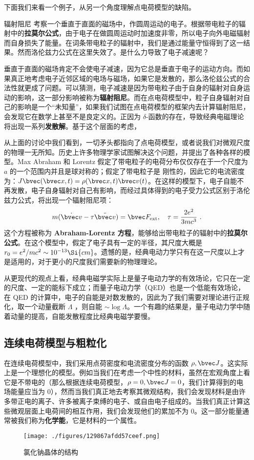 下面我们来看一个例子，从另一个角度理解点电荷模型的缺陷。
\begin{example}{辐射阻尼}
考察一个垂直于直面的磁场中，作圆周运动的电子。根据带电粒子的辐射中的\textbf{拉莫尔公式}，由于电子在做圆周运动时加速度非零，所以电子向外电磁辐射而自身损失了能量。在词条带电粒子的辐射中，我们是通过能量守恒得到了这一结果。然而洛伦兹力公式在这里失效了。是什么力导致了电子减速呢？
\end{example}
垂直于直面的磁场肯定不会使电子减速，因为它总是垂直于电子的运动方向。而如果真正地考虑电子近邻区域的电场与磁场，如果它是发散的，那么洛伦兹公式的合法性就更成了问题。可以猜测，电子减速是因为带电粒子由于自身的辐射对自身运动的影响，这一部分影响被称为\textbf{辐射阻尼}。而在点电荷模型中，粒子自身辐射对自己的影响是一个“未知量”，如果我们试图在点电荷模型的框架内去计算辐射阻尼，会发现它在数学上甚至不是良定义的。正因为 $\delta$-函数的存在，导致经典电磁理论将出现一系列\textbf{发散解}。基于这个层面的考虑，

从上面的讨论中我们看到，一切矛头都指向了点电荷模型，或者说我们对微观尺度的物理一无所知。历史上许多物理学家试图解决这个问题，并提出了各种各样的模型。Max Abraham 和 Lorentz 假定了带电粒子的电荷分布仅仅存在于一个尺度为 $a$ 的一个范围内并且是球对称的；假定了带电粒子是
刚性的，因此它的电流密度为：$J\bvec (\bvec x, t) =\rho(\bvec x, t)\bvec v(t)$。在这样的模型下，电子自能不再发散，电子自身辐射对自己有影响，而经过具体得到的电子受力公式区别于洛伦兹力公式，将出现一个辐射阻尼项：
\begin{equation}
m(\dot{\bvec v}-\tau \ddot{\bvec v})=\bvec F_{\text{ext}},\quad \tau =\frac{2e^2}{3mc^3}~.
\end{equation}
这个方程被称为 \textbf{Abraham-Lorentz 方程}，能够给出带电粒子的辐射中的\textbf{拉莫尔公式}。在这个模型中，假定了电子具有一定的半径，其尺度大概是 $r_0=e^2/mc^2\sim 10^{-13} \Si{cm}$。遗憾的是，经典电动力学只有在这一尺度以上才是适用的，对于更小的尺度我们需要新的物理理论。

从更现代的观点上看，经典电磁学实际上是量子电动力学的有效场论，它只在一定的尺度、一定的能标下成立；而量子电动力学（QED）也是一个低能有效场论，在 QED 的计算中，电子的自能是对数发散的，因此为了我们需要对理论进行正规化，取一个动量截断 $\Lambda$ ，则自能 $\sim \log \Lambda$。一个有趣的结果是，量子电动力学中随着动量的提高，自能发散程度比经典电磁学要慢。

\subsection{连续电荷模型与粗粒化}
在连续电荷模型中，我们采用点荷密度和电流密度分布的函数 $\rho,\bvec J$。这实际上是一个理想化的模型。例如当我们在考虑一个中性的材料，虽然在宏观角度上看它是不带电的（那么根据连续电荷模型，$\rho=0,\bvec J=0$，我们计算得到的电场能量应当为 $0$），然而当我们真正地去考察其微观结构，我们会发现材料是由许多带正电的离子、许多被离子束缚的电子、或自由电子组成的。当我们真正计算这些微观层面上电荷间的相互作用，我们会发现他们的累加不为 $0$。这一部分能量通常被我们称为\textbf{化学能}，它是材料的一个属性。
\begin{figure}[ht]
\centering
\texttt{[image: ./figures/129867afdd57ceef.png]}
\caption{氯化钠晶体的结构} \label{fig_elecdb_2}
\end{figure}


